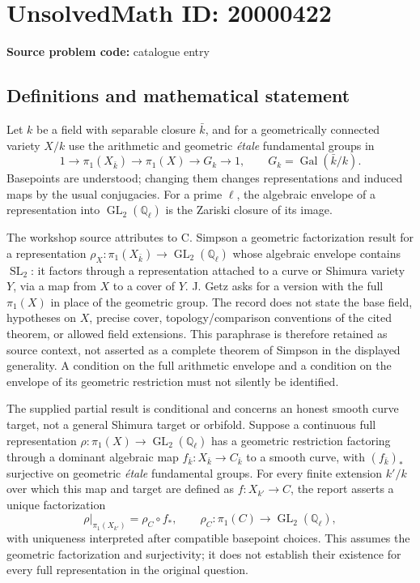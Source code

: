 \documentclass[11pt]{article}
\newcommand{\Q}{\mathbb{Q}}
\begin{document}
\section*{UnsolvedMath ID: 20000422}
\textbf{Source problem code:} catalogue entry
\subsection{Definitions and mathematical statement}
Let \(k\) be a field with separable closure \(\bar k\), and for a geometrically connected variety \(X/k\) use the arithmetic and geometric \emph{\'etale} fundamental groups in
\[
 1\longrightarrow\pi_1(X_{\bar k})\longrightarrow\pi_1(X)
 \longrightarrow G_k\longrightarrow1,
 \qquad G_k=\operatorname{Gal}(\bar k/k).
\]
Basepoints are understood; changing them changes representations and induced maps by the usual conjugacies. For a prime \(\ell\), the algebraic envelope of a representation into \(\operatorname{GL}_2(\Q_\ell)\) is the Zariski closure of its image.

The workshop source attributes to C. Simpson a geometric factorization result for a representation \(\rho_X:\pi_1(X_{\bar k})\to\operatorname{GL}_2(\Q_\ell)\) whose algebraic envelope contains \(\operatorname{SL}_2\): it factors through a representation attached to a curve or Shimura variety \(Y\), via a map from \(X\) to a cover of \(Y\). J. Getz asks for a version with the full \(\pi_1(X)\) in place of the geometric group. The record does not state the base field, hypotheses on \(X\), precise cover, topology/comparison conventions of the cited theorem, or allowed field extensions. This paraphrase is therefore retained as source context, not asserted as a complete theorem of Simpson in the displayed generality. A condition on the full arithmetic envelope and a condition on the envelope of its geometric restriction must not silently be identified.

The supplied partial result is conditional and concerns an honest smooth curve target, not a general Shimura target or orbifold. Suppose a continuous full representation \(\rho:\pi_1(X)\to\operatorname{GL}_2(\Q_\ell)\) has a geometric restriction factoring through a dominant algebraic map \(f_{\bar k}:X_{\bar k}\to C_{\bar k}\) to a smooth curve, with \((f_{\bar k})_*\) surjective on geometric \emph{\'etale} fundamental groups. For every finite extension \(k'/k\) over which this map and target are defined as \(f:X_{k'}\to C\), the report asserts a unique factorization
\[
 \rho|_{\pi_1(X_{k'})}=\rho_C\circ f_*,\qquad
 \rho_C:\pi_1(C)\longrightarrow\operatorname{GL}_2(\Q_\ell),
\]
with uniqueness interpreted after compatible basepoint choices. This assumes the geometric factorization and surjectivity; it does not establish their existence for every full representation in the original question.
\end{document}
